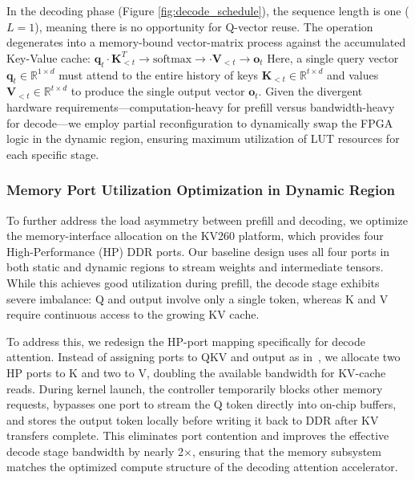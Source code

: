 \documentclass[9pt,sigconf]{acmart}
\begin{document}
In the decoding phase (Figure \ref{fig:decode_schedule}), the sequence length is one ($L=1$), meaning there is no opportunity for Q-vector reuse. The operation degenerates into a memory-bound vector-matrix process against the accumulated Key-Value cache:
$
\mathbf{q}_{t} \cdot \mathbf{K}_{<t}^T \rightarrow \text{softmax} \rightarrow \cdot \mathbf{V}_{<t} \rightarrow \mathbf{o}_t
$
Here, a single query vector $\mathbf{q}_t \in \mathbb{R}^{1 \times d}$ must attend to the entire history of keys $\mathbf{K}_{<t} \in \mathbb{R}^{t \times d}$ and values $\mathbf{V}_{<t} \in \mathbb{R}^{t \times d}$ to produce the single output vector $\mathbf{o}_t$. Given the divergent hardware requirements—computation-heavy for prefill versus bandwidth-heavy for decode—we employ partial reconfiguration to dynamically swap the FPGA logic in the dynamic region, ensuring maximum utilization of LUT resources for each specific stage.









\subsubsection{Memory Port Utilization Optimization in Dynamic Region}
To further address the load asymmetry between prefill and decoding, we optimize the memory-interface allocation on the KV260 platform, which provides four High-Performance (HP) DDR ports. Our baseline design uses all four ports in both static and dynamic regions to stream weights and intermediate tensors. While this achieves good utilization during prefill, the decode stage exhibits severe imbalance: Q and output involve only a single token, whereas K and V require continuous access to the growing KV cache.

To address this, we redesign the HP-port mapping specifically for decode attention. Instead of assigning ports to QKV and output as in~\cite{qiao2025tellmev2}, we allocate two HP ports to K and two to V, doubling the available bandwidth for KV-cache reads. During kernel launch, the controller temporarily blocks other memory requests, bypasses one port to stream the Q token directly into on-chip buffers, and stores the output token locally before writing it back to DDR after KV transfers complete. This eliminates port contention and improves the effective decode stage bandwidth by nearly 2$\times$, ensuring that the memory subsystem matches the optimized compute structure of the decoding attention accelerator.
\end{document}
